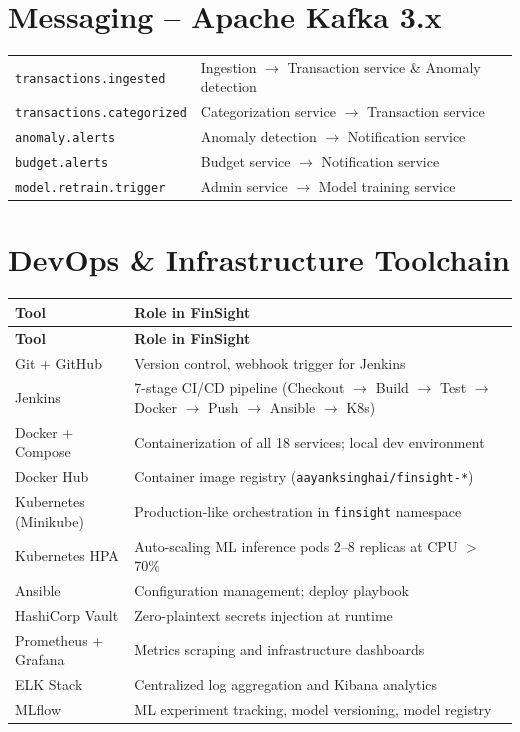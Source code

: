 \documentclass[12pt,a4paper]{report}
\begin{document}
\section{Messaging -- Apache Kafka 3.x}

\begin{techbox}
\begin{tabular}{ll}
\texttt{transactions.ingested}      & Ingestion $\rightarrow$ Transaction service \& Anomaly detection \\
\texttt{transactions.categorized}   & Categorization service $\rightarrow$ Transaction service \\
\texttt{anomaly.alerts}             & Anomaly detection $\rightarrow$ Notification service \\
\texttt{budget.alerts}              & Budget service $\rightarrow$ Notification service \\
\texttt{model.retrain.trigger}      & Admin service $\rightarrow$ Model training service \\
\end{tabular}
\end{techbox}

\section{DevOps \& Infrastructure Toolchain}

\begin{longtable}{p{3.5cm} p{10.5cm}}
\toprule
\textbf{Tool} & \textbf{Role in FinSight} \\
\midrule
\endfirsthead
\toprule
\textbf{Tool} & \textbf{Role in FinSight} \\
\midrule
\endhead
\bottomrule
\endlastfoot
Git + GitHub & Version control, webhook trigger for Jenkins \\
Jenkins & 7-stage CI/CD pipeline (Checkout $\rightarrow$ Build $\rightarrow$ Test $\rightarrow$ Docker $\rightarrow$ Push $\rightarrow$ Ansible $\rightarrow$ K8s) \\
Docker + Compose & Containerization of all 18 services; local dev environment \\
Docker Hub & Container image registry (\texttt{aayanksinghai/finsight-*}) \\
Kubernetes (Minikube) & Production-like orchestration in \texttt{finsight} namespace \\
Kubernetes HPA & Auto-scaling ML inference pods 2--8 replicas at CPU $>$ 70\% \\
Ansible & Configuration management; deploy playbook \\
HashiCorp Vault & Zero-plaintext secrets injection at runtime \\
Prometheus + Grafana & Metrics scraping and infrastructure dashboards \\
ELK Stack & Centralized log aggregation and Kibana analytics \\
MLflow & ML experiment tracking, model versioning, model registry \\
\end{longtable}
\end{document}
